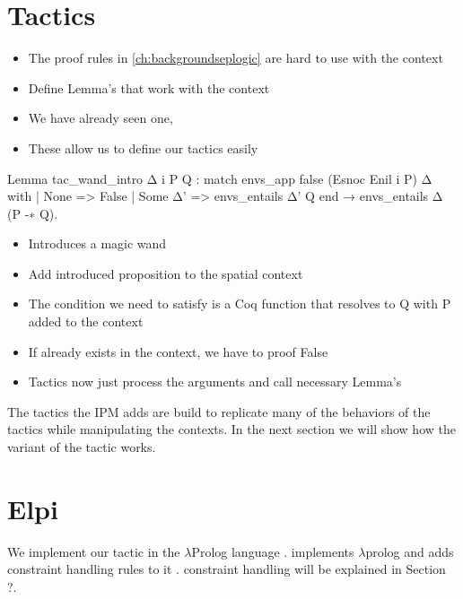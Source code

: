 \documentclass[thesis.tex]{subfiles}
\begin{document}
{\section{Tactics}
\begin{itemize}
  \item The proof rules in \cref{ch:backgroundseplogic} are hard to use with the context
  \item Define Lemma's that work with the context
  \item We have already seen one, 
  \item These allow us to define our tactics easily
\end{itemize}
\begin{coqcode}
  Lemma tac_wand_intro Δ i P Q :
    match envs_app false (Esnoc Enil i P) Δ with
    | None => False
    | Some Δ' => envs_entails Δ' Q
    end →
    envs_entails Δ (P -∗ Q).
\end{coqcode}
\begin{itemize}
  \item Introduces a magic wand
  \item Add introduced proposition to the spatial context
  \item The condition we need to satisfy is a Coq function that resolves to Q with P added to the context
  \item If  already exists in the context, we have to proof False
  \item Tactics now just process the arguments and call necessary Lemma's
\end{itemize}
The tactics the IPM adds are build to replicate many of the behaviors of the \coq tactics while manipulating the \iris contexts. In the next section we will show how the \iris variant of the  tactic works.


\section{Elpi}

We implement our tactic in the $\lambda$Prolog language \elpi \cite{dunchevELPIFastEmbeddable2015,guidiImplementingTypeTheory2019}. \elpi implements $\lambda$prolog \cite{millerHigherorderLogicProgramming1986,millerUniformProofsFoundation1991,belleanneePragmaticReconstructionLProlog1999,millerProgrammingHigherOrderLogic2012} and adds constraint handling rules to it \cite{monfroyConstraintHandlingRules2011}. constraint handling will be explained in Section ?.

}
\end{document}
